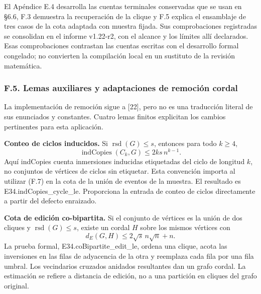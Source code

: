 \documentclass[spanish,11pt,a4paper]{article}
\begin{document}
El Apéndice E.4 desarrolla las cuentas terminales conservadas que se usan en §6.6, F.3 demuestra la recuperación de la clique y F.5 explica el ensamblaje de tres casos de la cota adaptada con muestra fijada. Sus comprobaciones registradas se consolidan en el informe v1.22-r2, con el alcance y los límites allí declarados. Esas comprobaciones contrastan las cuentas escritas con el desarrollo formal congelado; no convierten la compilación local en un sustituto de la revisión matemática.

\subsubsection{F.5. Lemas auxiliares y adaptaciones de remoción cordal}\label{f.5.-lemas-auxiliares-y-adaptaciones-de-remocion-cordal}

La implementación de remoción sigue a {[}22{]}, pero no es una traducción literal de sus enunciados y constantes. Cuatro lemas finitos explicitan los cambios pertinentes para esta aplicación.

\textbf{Conteo de ciclos inducidos.} Si \(\operatorname{rsd}(G)\le s\), entonces para todo \(k\ge4\), \[
\operatorname{indCopies}(C_k,G)\le2ks\,n^{k-1}.
\tag{F.7}
\] Aquí indCopies cuenta inmersiones inducidas etiquetadas del ciclo de longitud \(k\), no conjuntos de vértices de ciclos sin etiquetar. Esta convención importa al utilizar (F.7) en la cota de la unión de eventos de la muestra. El resultado es {\ttfamily\small E34.\discretionary{\hbox{\ensuremath{\hookrightarrow}}}{}{}indCopies\_\discretionary{\hbox{\ensuremath{\hookrightarrow}}}{}{}cycle\_\discretionary{\hbox{\ensuremath{\hookrightarrow}}}{}{}le}. Proporciona la entrada de conteo de ciclos directamente a partir del defecto enraizado.

\textbf{Cota de edición co-bipartita.} Si el conjunto de vértices es la unión de dos cliques y \(\operatorname{rsd}(G)\le s\), existe un cordal \(H\) sobre los mismos vértices con \[
d_E(G,H)\le2\sqrt{s}\,n\sqrt n+n.
\tag{F.8}
\] La prueba formal, {\ttfamily\small E34.\discretionary{\hbox{\ensuremath{\hookrightarrow}}}{}{}coBipartite\_\discretionary{\hbox{\ensuremath{\hookrightarrow}}}{}{}edit\_\discretionary{\hbox{\ensuremath{\hookrightarrow}}}{}{}le}, ordena una clique, acota las inversiones en las filas de adyacencia de la otra y reemplaza cada fila por una fila umbral. Los vecindarios cruzados anidados resultantes dan un grafo cordal. La estimación se refiere a distancia de edición, no a una partición en cliques del grafo original.
\end{document}
